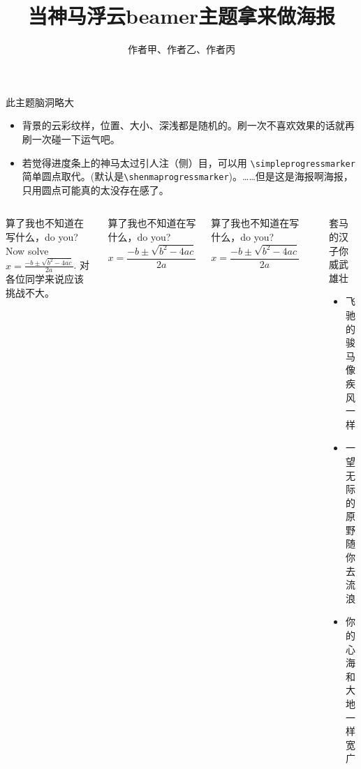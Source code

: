 \documentclass[t,linespread=1.3]{ctexbeamer}
\title{当神马浮云beamer主题拿来做海报}
\author{作者甲、作者乙、作者丙}
\begin{document}
\begin{frame}[fragile]
\gdef\inserttotalframenumber{10}
\gdef\insertframenumber{3}

    
\frametitle{\insertshorttitle}
\framesubtitle{\insertshortauthor}

\begin{block}{此主题脑洞略大}

  \begin{itemize}
    \item 背景的云彩纹样，位置、大小、深浅都是随机的。刷一次不喜欢效果的话就再刷一次碰一下运气吧。
    \item 若觉得进度条上的神马太过引人注（侧）目，可以用 \verb|\simpleprogressmarker| 简单圆点取代。(默认是\verb|\shenmaprogressmarker|)。……但是这是海报啊海报，只用圆点可能真的太没存在感了。
  \end{itemize}
    
\end{block}

\begin{columns}[T]

\begin{exampleblock}{算了我也不知道在写什么，do you?}
    Now solve $x = \frac{-b \pm \sqrt{b^2 -4ac}}{2a}$. 对各位同学来说应该挑战不大。
\end{exampleblock}

\begin{alertblock}{算了我也不知道在写什么，do you?}
    \[ x = \frac{-b \pm \sqrt{b^2 -4ac}}{2a} \]
\end{alertblock}

\begin{block}{算了我也不知道在写什么，do you?}
    \[ x = \frac{-b \pm \sqrt{b^2 -4ac}}{2a} \]
\end{block}

\textcolor{structure!80}{\rule{.1mm}{.27\textheight}}


\begin{block}{套马的汉子你威武雄壮}

  \begin{itemize}
    \item 飞驰的骏马像疾风一样
    \item 一望无际的原野随你去流浪
    \item 你的心海和大地一样宽广
  \end{itemize}


\end{block}
\end{columns}
\end{frame}
\end{document}
